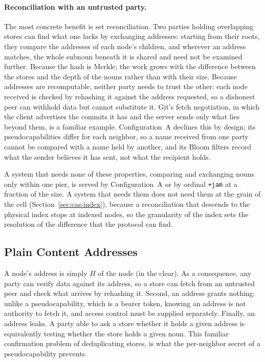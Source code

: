 \documentclass[twoside]{article}
\begin{document}
\paragraph*{Reconciliation with an untrusted party.}  The most concrete benefit is set reconciliation.  Two parties holding overlapping stores can find what one lacks by exchanging addresses:  starting from their roots, they compare the addresses of each node's children, and wherever an address matches, the whole subnoun beneath it is shared and need not be examined further.  Because the hash is Merkle, the work grows with the difference between the stores and the depth of the nouns rather than with their size.  Because addresses are recomputable, neither party needs to trust the other:  each node received is checked by rehashing it against the address requested, so a dishonest peer can withhold data but cannot substitute it.  Git's fetch negotiation, in which the client advertises the commits it has and the server sends only what lies beyond them, is a familiar example.  Configuration~A declines this by design; its pseudocapabilities differ for each neighbor, so a name received from one party cannot be compared with a name held by another, and its Bloom filters record what the sender believes it has sent, not what the recipient holds.

A system that needs none of these properties, comparing and exchanging nouns only within one pier, is served by Configuration~A or by ordinal \texttt{+jam} at a fraction of the size.  A system that needs them does not need them at the grain of the cell (Section~\ref{sec:cas-index}), because a reconciliation that descends to the physical index stops at indexed nodes, so the granularity of the index sets the resolution of the difference that the protocol can find.

\subsection{Plain Content Addresses}

A node's address is simply $H$ of the node (in the clear).  As a consequence, any party can verify data against its address, so a store can fetch from an untrusted peer and check what arrives by rehashing it.  Second, an address grants nothing:  unlike a pseudocapability, which is a bearer token, knowing an address is not authority to fetch it, and access control must be supplied separately.  Finally, an address leaks.  A party able to ask a store whether it holds a given address is equivalently testing whether the store holds a given noun.  This familiar confirmation problem of deduplicating stores, is what the per-neighbor secret of a pseudocapability prevents.
\end{document}
